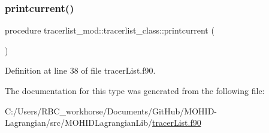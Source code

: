 \subsubsection{\texorpdfstring{printcurrent()}{printcurrent()}}
{\footnotesize\ttfamily procedure tracerlist\+\_\+mod\+::tracerlist\+\_\+class\+::printcurrent (\begin{DoxyParamCaption}{ }\end{DoxyParamCaption})\hspace{0.3cm}{\ttfamily [private]}}



Definition at line 38 of file tracer\+List.\+f90.



The documentation for this type was generated from the following file\+:\begin{DoxyCompactItemize}
\item 
C\+:/\+Users/\+R\+B\+C\+\_\+workhorse/\+Documents/\+Git\+Hub/\+M\+O\+H\+I\+D-\/\+Lagrangian/src/\+M\+O\+H\+I\+D\+Lagrangian\+Lib/\mbox{\hyperlink{tracer_list_8f90}{tracer\+List.\+f90}}\end{DoxyCompactItemize}
